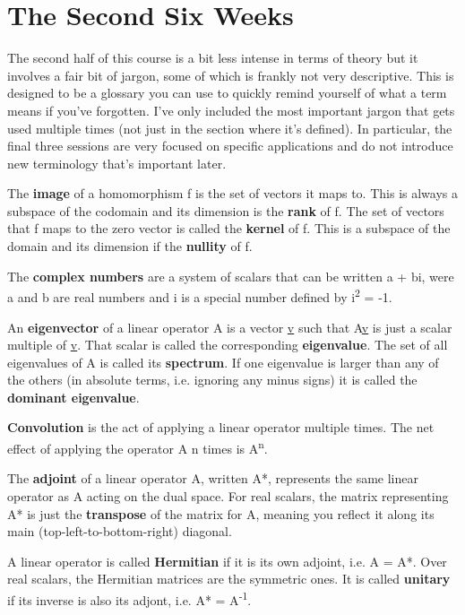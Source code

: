 \documentclass[oneside,english]{amsbook}
\numberwithin{section}{chapter}
\theoremstyle{plain}
\theoremstyle{definition}
\begin{document}
\part{The Second Six Weeks}

The second half of this course is a bit less intense in terms of theory
but it involves a fair bit of jargon, some of which is frankly not very
descriptive. This is designed to be a glossary you can use to quickly
remind yourself of what a term means if you've forgotten. I've only
included the most important jargon that gets used multiple times (not
just in the section where it's defined). In particular, the final three
sessions are very focused on specific applications and do not introduce
new terminology that's important later.

The \textbf{image} of a homomorphism f is the set of vectors it maps to.
This is always a subspace of the codomain and its dimension is the
\textbf{rank} of f. The set of vectors that f maps to the zero vector is
called the \textbf{kernel} of f. This is a subspace of the domain and
its dimension if the \textbf{nullity} of f.

The \textbf{complex numbers} are a system of scalars that can be written
a + bi, were a and b are real numbers and i is a special number defined
by i\textsuperscript{2} = -1.

An \textbf{eigenvector} of a linear operator A is a vector \ul{v} such
that A\ul{v} is just a scalar multiple of \ul{v}. That scalar is called
the corresponding \textbf{eigenvalue}. The set of all eigenvalues of A
is called its \textbf{spectrum}. If one eigenvalue is larger than any of
the others (in absolute terms, i.e. ignoring any minus signs) it is
called the \textbf{dominant eigenvalue}.

\textbf{Convolution} is the act of applying a linear operator multiple
times. The net effect of applying the operator A n times is
A\textsuperscript{n}.

The \textbf{adjoint} of a linear operator A, written A*, represents the
same linear operator as A acting on the dual space. For real scalars,
the matrix representing A* is just the \textbf{transpose} of the matrix
for A, meaning you reflect it along its main (top-left-to-bottom-right)
diagonal.

A linear operator is called \textbf{Hermitian} if it is its own adjoint,
i.e. A = A*. Over real scalars, the Hermitian matrices are the symmetric
ones. It is called \textbf{unitary} if its inverse is also its adjont,
i.e. A* = A\textsuperscript{-1}.
\end{document}
